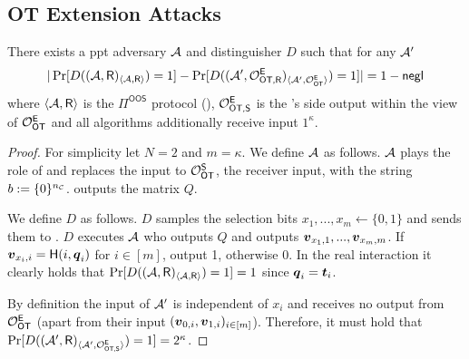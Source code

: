 \subsection{OT Extension Attacks}


\begin{lemma} 
	There exists a ppt adversary $\mathcal{A}$ and distinguisher $D$ such that for any $\mathcal{A}'$ 
	$$
		|\Pr[D((\mathcal{A}, \mathsf{R})_{\langle\mathcal{A},\mathsf{R}\rangle})=1]-\Pr[D((\mathcal{A}', \mathcal{O}^{\mathsf{E}}_{\textsf{OT,\ensuremath{\mathsf{R}}}})_{\langle\mathcal{A}',\mathcal{O}^{\mathsf{E}}_{\textsf{OT}}\rangle})=1]|=1-\mathsf{negl}
	$$
	where $\langle\mathcal{A},\mathsf{R}\rangle$ is the $\Pi^{\textsf{OOS}}$ protocol (), $\mathcal{O}^{\mathsf{E}}_{\textsf{OT,\ensuremath{\mathsf{S}}}}$ is the \send's side output within the view of $\mathcal{O}_{\mathsf{OT}}^{\mathsf{E}}$ and all algorithms additionally receive input $1^\kappa$. 
\end{lemma}
\begin{proof} 
	For simplicity let $N=2$ and $m=\kappa$. We define $\mathcal{A}$ as follows. $\mathcal{A}$ plays the role of \send and replaces the input to $\mathcal{O}_{\mathsf{OT}}^\mathsf{S}$, the receiver input, with the string $b:=\{0\}^{{n_\mathcal{C}}}$. \Adv outputs the matrix $Q$.
	
	We define $D$ as follows. $D$ samples the selection bits $x_1,...,x_m\gets\{0,1\}$ and sends them to \rec. $D$ executes $\mathcal{A}$ who outputs $Q$ and \rec outputs $\boldsymbol{v}_{x_1,1},...,\boldsymbol{v}_{x_m,m}$. If $\boldsymbol{v}_{x_i,i}=\mathsf{H}(i,\boldsymbol{q}_i)$ for $i\in[m]$, output 1, otherwise 0. In the real interaction it clearly holds that $\Pr[D((\mathcal{A}, \mathsf{R})_{\langle\mathcal{A},\mathsf{R}\rangle})=1]=1$ since $\boldsymbol{q}_i=\boldsymbol{t}_i$.
	
	By definition the input of $\mathcal{A}'$ is independent of $x_i$ and receives no output from $\mathcal{O}_{\mathsf{OT}}^\mathsf{E}$ (apart from their input $(\boldsymbol{v}_{0,i},\boldsymbol{v}_{1,i})_{i\in [m]}$). Therefore, it must hold that $\Pr[D((\mathcal{A}', \mathsf{R})_{\langle\mathcal{A}',\mathcal{O}^{\mathsf{E}}_{\textsf{OT,\ensuremath{\mathsf{S}}}}\rangle})=1]=2^{\kappa}$.
\end{proof}


